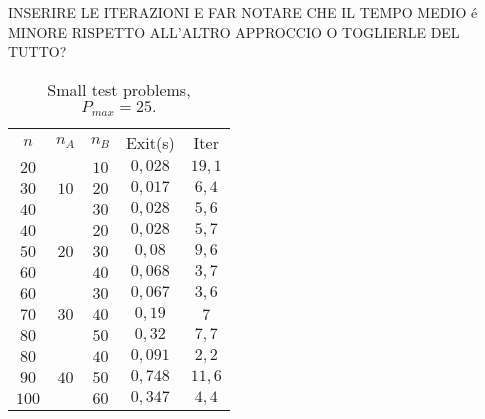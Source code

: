 \documentclass[opre,nonblindrev]{informs3} %
\begin{document}
INSERIRE LE ITERAZIONI E FAR NOTARE CHE IL TEMPO MEDIO é MINORE RISPETTO ALL'ALTRO APPROCCIO O TOGLIERLE DEL TUTTO?

\begin{table}[h]\scriptsize
	\begin{center}
		\begin{tabular}{|| c |c | c|| c||c ||}\hline
			
			\multirow{3}{*}{$n$} & \multirow{3}{*}{$n_A$} & \multirow{3}{*}{$n_B$} & \multirow{3}{*}{Exit(s)} & \multirow{3}{*}{Iter}\\
			&  &&  & \\
			&    &    &  &\\\hline
			$20$	 & \multirow{3}{*}{$10$}   & $10$   &$0,028$  & $19,1$
			\\
			$30$  &  & $20$	 & $0,017$
			&$6,4$
			\\ 
			$40$  &  & $30$	 & $0,028$
			&$5,6$
			\\ \hline
			
			$40$	 & \multirow{3}{*}{$20$}   & $20$   & $0,028$
			& $5,7$
			\\
			$50$  &  & $30$	 &$0,08$
			&$9,6$
			\\ 
			$60$  &  & $40$	 &$0,068$ &$3,7$\\ \hline
			
			$60$	 & \multirow{3}{*}{$30$}   & $30$   &  $0,067$
			& $3,6$
			\\
			$70$  &  & $40$	 &$0,19$
			&$7$
			\\ 
			$80$  &  & $50$	 & $0,32$
			&$7,7$
			\\ \hline
			
			$80$	 & \multirow{3}{*}{$40$}   & $40$   &  $0,091$
			&$2,2$
			\\
			$90$  &  & $50$	 & $0,748$
			&$11,6$
			\\ 
			$100$  &  & $60$	 & $0,347$
			&$4,4$
			\\ \hline 
		\end{tabular}
	\end{center}
	\caption{Small test problems, $P_{max}= 25.$} \label{small}
\end{table}
\end{document}
